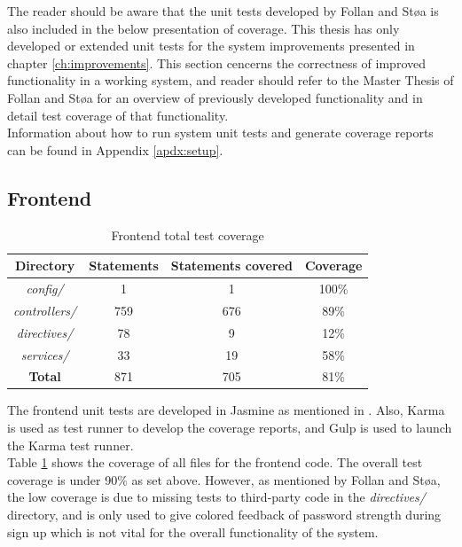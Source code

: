 The reader should be aware that the unit tests developed by Follan and Støa is also included in the below presentation of coverage. This thesis has only developed or extended unit tests for the system improvements presented in chapter \ref{ch:improvements}. This section cencerns the correctness of improved functionality in a working system, and reader should refer to the Master Thesis of Follan and Støa for an overview of previously developed functionality and in detail test coverage of that functionality.  \\

Information about how to run system unit tests and generate coverage reports can be found in Appendix \ref{apdx:setup}.

\subsection{Frontend}
\begin{table}[h!]
    \centering
    \begin{tabular}{c c c c}
      \hline
      \textbf{Directory} & \textbf{Statements} & \textbf{Statements covered} & \textbf{Coverage} \\ \hline
      \textit{config/} & 1 & 1 & 100\% \\
      \textit{controllers/} & 759 & 676 & 89\% \\
      \textit{directives/} & 78 & 9 & 12\% \\
      \textit{services/} & 33 & 19 & 58\% \\ \hline
      \textbf{Total} & 871 & 705 & 81\% \\ \hline
    \end{tabular}
    \caption{Frontend total test coverage}
    \label{tab:frontend-coverage-all}
\end{table}

The frontend unit tests are developed in Jasmine \cite{JASMINE} as mentioned in . Also, Karma \cite{KARMA} is used as test runner to develop the coverage reports, and Gulp \cite{GULP} is used to launch the Karma test runner.  \\

Table \ref{tab:frontend-coverage-all} shows the coverage of all files for the frontend code. The overall test coverage is under 90\% as set above. However, as mentioned by Follan and Støa, the low coverage is due to missing tests to third-party code in the \textit{directives/} directory, and is only used to give colored feedback of password strength during sign up which is not vital for the overall functionality of the system. \\

